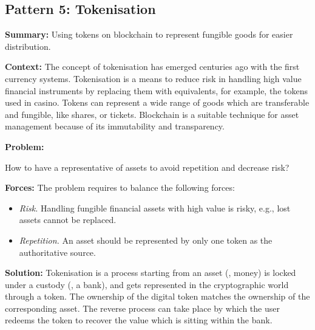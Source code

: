 
\subsection{ \textbf{Pattern 5: Tokenisation}}
\label{sec:tokenisation}

\noindent \textbf{Summary:} Using tokens on blockchain to represent fungible goods for easier distribution. 

\vspace{0.5em}\noindent \textbf{Context:} 
The concept of tokenisation has emerged centuries ago with the first currency systems. Tokenisation is a means to reduce risk in handling high value financial instruments by replacing them with equivalents, for example, the tokens used in casino. Tokens can represent a wide range of goods which are transferable and fungible, like shares, or tickets. Blockchain is a suitable technique for asset management because of its immutability and transparency. 

\vspace{0.5em}\noindent \textbf{Problem:} 

How to have a representative of assets to avoid repetition and decrease risk?

\vspace{0.5em}\noindent \textbf{Forces:} The problem requires to balance the following forces:
\begin{itemize}
  \item \textit{Risk.} Handling fungible financial assets with high value is risky, e.g., lost %
  assets cannot be replaced.
  \item \textit{Repetition.} An asset should be represented by only one token as the authoritative source. 
\end{itemize}

\vspace{0.5em}\noindent \textbf{Solution:} 
Tokenisation is a process starting from an asset (\eg, money) is locked under a custody (\eg, a bank), and gets represented in the cryptographic world through a token. The ownership of the digital token matches the ownership of the corresponding asset. The reverse process can take place by which the user redeems the token to recover the value which is sitting within the bank. 

